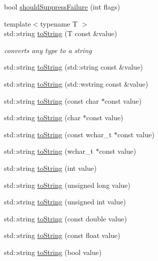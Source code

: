 \begin{DoxyCompactItemize}
\item 
bool \mbox{\hyperlink{namespace_catch_ab91eb13081203d634fe48d3d2ab386d7}{should\+Suppress\+Failure}} (int flags)
\item 
{\footnotesize template$<$typename T $>$ }\\std\+::string \mbox{\hyperlink{namespace_catch_adbd1730f961da94d9ed284f70fd7a28b}{to\+String}} (T const  \&value)
\begin{DoxyCompactList}\small\item\em converts any type to a string \end{DoxyCompactList}\item 
std\+::string \mbox{\hyperlink{namespace_catch_ad6e969257437cf007b8b5017b22e570c}{to\+String}} (std\+::string const \&value)
\item 
std\+::string \mbox{\hyperlink{namespace_catch_af9fc40701e3a7d0790866e7cf8c0279f}{to\+String}} (std\+::wstring const \&value)
\item 
std\+::string \mbox{\hyperlink{namespace_catch_ace2e2fe33b196bc8278f605dcb72e38d}{to\+String}} (const char $\ast$const value)
\item 
std\+::string \mbox{\hyperlink{namespace_catch_ae6c2bc95517444d8df8199bd3f61609b}{to\+String}} (char $\ast$const value)
\item 
std\+::string \mbox{\hyperlink{namespace_catch_afa173b4639c682c9d8c20fae0939693c}{to\+String}} (const wchar\+\_\+t $\ast$const value)
\item 
std\+::string \mbox{\hyperlink{namespace_catch_aa39121565abe9f30fce5d48e4e094768}{to\+String}} (wchar\+\_\+t $\ast$const value)
\item 
std\+::string \mbox{\hyperlink{namespace_catch_acee54d0580385e4347bc42a7d22bc893}{to\+String}} (int value)
\item 
std\+::string \mbox{\hyperlink{namespace_catch_aba1d78bce62f8c73cbfc2a14225356ea}{to\+String}} (unsigned long value)
\item 
std\+::string \mbox{\hyperlink{namespace_catch_a6fd78030f740c1c3bdc60efdfd5fc85d}{to\+String}} (unsigned int value)
\item 
std\+::string \mbox{\hyperlink{namespace_catch_a3eb4356d09b7ef3286f6c1c1efe8cabf}{to\+String}} (const double value)
\item 
std\+::string \mbox{\hyperlink{namespace_catch_a80b6411e2cba89e58aa8feb960d045d5}{to\+String}} (const float value)
\item 
std\+::string \mbox{\hyperlink{namespace_catch_a5d3bdb2ec0e6f415e2a1a0e4914d7d3a}{to\+String}} (bool value)

\end{DoxyCompactItemize}
